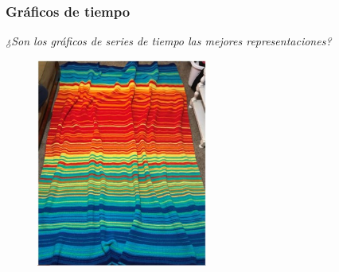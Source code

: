 \documentclass[10pt]{beamer}
\begin{document}





\begin{frame}[fragile]
\frametitle{Gráficos de tiempo}

\begin{center}
\textit{¿Son los gráficos de series de tiempo las mejores representaciones?}
\end{center}



\begin{figure}
\begin{center}
    \includegraphics[width=0.5\textwidth]{Imagen18.JPG}
\end{center}
\end{figure}




\end{frame}


\end{document}
